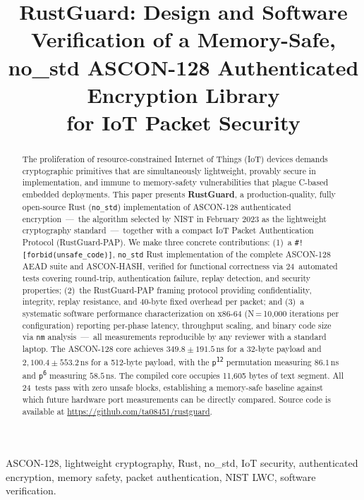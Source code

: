 \documentclass[conference]{IEEEtran}
\title{RustGuard: Design and Software Verification of a Memory-Safe,\\
no\_std ASCON-128 Authenticated Encryption Library\\
for IoT Packet Security}
\author{
  \IEEEauthorblockN{Taha Hunaid Ali \quad Farhan Khan}
  \IEEEauthorblockA{
    \textit{Dhanani School of Science and Engineering}\\
    \textit{Habib University}\\
    Karachi, Pakistan\\
    ta08451@st.habib.edu.pk \quad farhan.khan@sse.habib.edu.pk
  }
}
\begin{document}
\maketitle

\begin{abstract}
The proliferation of resource-constrained Internet of Things (IoT) devices
demands cryptographic primitives that are simultaneously lightweight, provably
secure in implementation, and immune to memory-safety vulnerabilities that
plague C-based embedded deployments. This paper presents \textbf{RustGuard},
a production-quality, fully open-source Rust (\texttt{no\_std}) implementation
of ASCON-128 authenticated encryption~---~the algorithm selected by NIST in
February 2023 as the lightweight cryptography standard~---~together with a
compact IoT Packet Authentication Protocol (RustGuard-PAP). We make three
concrete contributions: (1)~a \texttt{\#![forbid(unsafe\_code)]},
\texttt{no\_std} Rust implementation of the complete ASCON-128 AEAD suite and
ASCON-HASH, verified for functional correctness via 24~automated tests covering
round-trip, authentication failure, replay detection, and security properties;
(2)~the RustGuard-PAP framing protocol providing confidentiality, integrity,
replay resistance, and 40-byte fixed overhead per packet; and (3)~a systematic
software performance characterization on x86-64 (N\,=\,10{,}000 iterations per
configuration) reporting per-phase latency, throughput scaling, and binary code
size via \texttt{nm} analysis~---~all measurements reproducible by any reviewer
with a standard laptop. The ASCON-128 core achieves $349.8 \pm 191.5$\,ns for a
32-byte payload and $2{,}100.4 \pm 553.2$\,ns for a 512-byte payload, with
the \texttt{p\textsuperscript{12}} permutation measuring $86.1$\,ns and
\texttt{p\textsuperscript{6}} measuring $58.5$\,ns. The compiled core occupies
11{,}605 bytes of text segment. All 24~tests pass with zero unsafe blocks,
establishing a memory-safe baseline against which future hardware port
measurements can be directly compared. Source code is available at
\url{https://github.com/ta08451/rustguard}.
\end{abstract}

\begin{IEEEkeywords}
ASCON-128, lightweight cryptography, Rust, no\_std, IoT security, authenticated
encryption, memory safety, packet authentication, NIST LWC, software
verification.
\end{IEEEkeywords}
\end{document}
